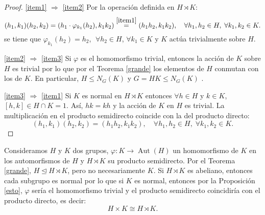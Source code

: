 \begin{proof}
\mbox{}\par 
\ref{item1} $\Rightarrow$ \ref{item2} Por la operación definida en $H \rtimes K$:
\[
    (h_1,k_1)(h_2,k_2) = (h_1 \cdot \varphi_{k_1}(h_2), k_1k_2) \stackrel{\ref{item1}}{=} (h_1 h_2, k_1k_2), \quad \forall h_1,h_2 \in H, \; \forall k_1,k_2 \in K.
\]
se tiene que $\varphi_{k_1}(h_2) = h_2$,  $\; \forall h_2 \in H$, $\forall k_1 \in K$ y $K$ actúa trivialmente sobre $H$.



\ref{item2} $\Rightarrow$ \ref{item3} Si $\varphi$ es el homomorfismo trivial, entonces la acción de $K$ sobre $H$ es trivial por lo que por el Teorema \ref{grande} los elementos de $H$ conmutan con los de $K$. En particular, $H \leq N_G(K)$ y $G=HK \leq N_G(K)$ .



\ref{item3} $\Rightarrow$ \ref{item1} Si $K$ es normal en $H \rtimes K$ entonces $\forall h \in H$ y $k \in K$, $[h,k]\in H\cap K=1$. Así, $hk=kh$ y la acción de $K$ en $H$ es trivial. La multiplicación en el producto semidirecto coincide con la del producto directo:
\[
    (h_1,k_1)(h_2,k_2) = (h_1h_2,k_1k_2) ,\quad \forall h_1,h_2 \in H, \;\forall k_1, k_2 \in K.
\]
\end{proof}



Consideramos $H$ y $K$ dos grupos, $\varphi  \colon K \rightarrow \operatorname{Aut}(H)$ un homomorfismo de $K$ en los automorfismos de $H$  y $H \rtimes K$ su producto semidirecto. Por el Teorema \ref{grande}, $H \trianglelefteq H \rtimes K$, pero no necesariamente $K$. Si $H\rtimes K$ es abeliano, entonces cada subgrupo es normal por lo que si $K$ es normal, entonces por la Proposición \ref{esto}, $\varphi$ sería el homomorfismo trivial y el producto semidirecto coincidiría con el producto directo, es decir:
\[
    H \times K \cong H \rtimes K .
\]

